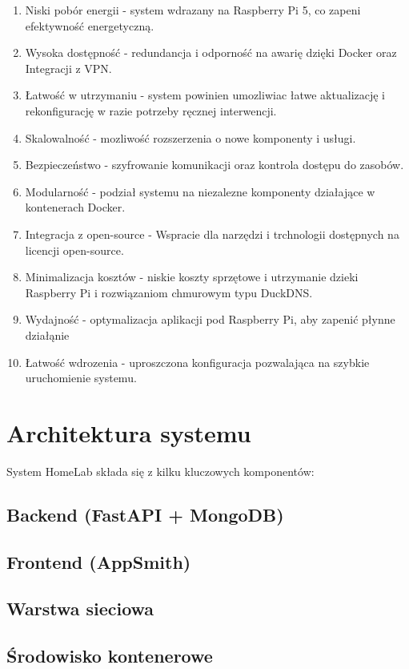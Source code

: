 \begin{enumerate}
    \item Niski pobór energii - system wdrazany na Raspberry Pi 5, co zapeni efektywność energetyczną.
    \item Wysoka dostępność - redundancja i odporność na awarię dzięki Docker oraz Integracji z VPN.
    \item Łatwość w utrzymaniu - system powinien umozliwiac łatwe aktualizację i rekonfigurację w razie potrzeby ręcznej interwencji.
    \item Skalowalność - mozliwość rozszerzenia o nowe komponenty i usługi.
    \item Bezpieczeństwo - szyfrowanie komunikacji oraz kontrola dostępu do zasobów.
    \item Modularność - podział systemu na niezalezne komponenty działające w kontenerach Docker.
    \item Integracja z open-source - Wspracie dla narzędzi i trchnologii dostępnych na licencji open-source.
    \item Minimalizacja kosztów - niskie koszty sprzętowe i utrzymanie dzieki Raspberry Pi i rozwiązaniom chmurowym typu DuckDNS.
    \item Wydajność - optymalizacja aplikacji pod Raspberry Pi, aby zapenić płynne działąnie 
    \item Łatwość wdrozenia - uproszczona konfiguracja pozwalająca na szybkie uruchomienie systemu.
\end{enumerate}

\section{Architektura systemu}
System HomeLab składa się z kilku kluczowych komponentów:

\subsection{Backend (FastAPI + MongoDB)}

\subsection{Frontend (AppSmith)}

\subsection{Warstwa sieciowa}

\subsection{Środowisko kontenerowe}

